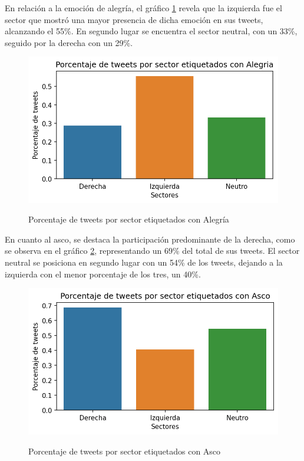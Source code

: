 En relación a la emoción de alegría, el gráfico \ref{figure:tweets_percent_alegria} revela que la izquierda fue el sector que mostró una mayor presencia de dicha emoción en sus tweets, alcanzando el 55\%. En segundo lugar se encuentra el sector neutral, con un 33\%, seguido por la derecha con un 29\%.

\begin{figure}[h]
	\caption{Porcentaje de tweets por sector etiquetados con Alegría}
	\centering
	\includegraphics{../Images/Results/Porcentaje de tweets por sector etiquetados con Alegria.png} 
	\label{figure:tweets_percent_alegria}
\end{figure}

En cuanto al asco, se destaca la participación predominante de la derecha, como se observa en el gráfico \ref{figure:tweets_percent_asco}, representando un 69\% del total de sus tweets. El sector neutral se posiciona en segundo lugar con un 54\% de los tweets, dejando a la izquierda con el menor porcentaje de los tres, un 40\%.

\begin{figure}[h]
	\caption{Porcentaje de tweets por sector etiquetados con Asco}
	\centering
	\includegraphics{../Images/Results/Porcentaje de tweets por sector etiquetados con Asco.png} 
	\label{figure:tweets_percent_asco}
\end{figure}


